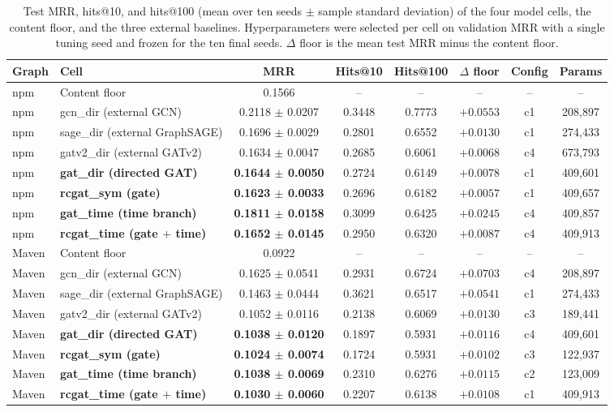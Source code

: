 \begin{table}[t]
\caption{Test MRR, hits@10, and hits@100 (mean over ten seeds $\pm$ sample standard
deviation) of the four model cells, the content floor, and the three external baselines.
Hyperparameters were selected per cell on validation MRR with a single tuning seed and
frozen for the ten final seeds. $\Delta$ floor is the mean test MRR minus the content floor.}
\label{tab:main}
\begin{tabular}{llcccccc}
\toprule
Graph & Cell & MRR & Hits@10 & Hits@100 & $\Delta$ floor & Config & Params \\
\midrule
npm & Content floor & 0.1566 & -- & -- & -- & -- & -- \\
npm & gcn\_dir (external GCN) & 0.2118 $\pm$ 0.0207 & 0.3448 & 0.7773 & $+0.0553$ & c1 & 208{,}897 \\
npm & sage\_dir (external GraphSAGE) & 0.1696 $\pm$ 0.0029 & 0.2801 & 0.6552 & $+0.0130$ & c1 & 274{,}433 \\
npm & gatv2\_dir (external GATv2) & 0.1634 $\pm$ 0.0047 & 0.2685 & 0.6061 & $+0.0068$ & c4 & 673{,}793 \\
npm & \textbf{gat\_dir (directed GAT)} & \textbf{0.1644 $\pm$ 0.0050} & 0.2724 & 0.6149 & $+0.0078$ & c1 & 409{,}601 \\
npm & \textbf{rcgat\_sym (gate)} & \textbf{0.1623 $\pm$ 0.0033} & 0.2696 & 0.6182 & $+0.0057$ & c1 & 409{,}657 \\
npm & \textbf{gat\_time (time branch)} & \textbf{0.1811 $\pm$ 0.0158} & 0.3099 & 0.6425 & $+0.0245$ & c4 & 409{,}857 \\
npm & \textbf{rcgat\_time (gate $+$ time)} & \textbf{0.1652 $\pm$ 0.0145} & 0.2950 & 0.6320 & $+0.0087$ & c4 & 409{,}913 \\
\midrule
Maven & Content floor & 0.0922 & -- & -- & -- & -- & -- \\
Maven & gcn\_dir (external GCN) & 0.1625 $\pm$ 0.0541 & 0.2931 & 0.6724 & $+0.0703$ & c4 & 208{,}897 \\
Maven & sage\_dir (external GraphSAGE) & 0.1463 $\pm$ 0.0444 & 0.3621 & 0.6517 & $+0.0541$ & c1 & 274{,}433 \\
Maven & gatv2\_dir (external GATv2) & 0.1052 $\pm$ 0.0116 & 0.2138 & 0.6069 & $+0.0130$ & c3 & 189{,}441 \\
Maven & \textbf{gat\_dir (directed GAT)} & \textbf{0.1038 $\pm$ 0.0120} & 0.1897 & 0.5931 & $+0.0116$ & c4 & 409{,}601 \\
Maven & \textbf{rcgat\_sym (gate)} & \textbf{0.1024 $\pm$ 0.0074} & 0.1724 & 0.5931 & $+0.0102$ & c3 & 122{,}937 \\
Maven & \textbf{gat\_time (time branch)} & \textbf{0.1038 $\pm$ 0.0069} & 0.2310 & 0.6276 & $+0.0115$ & c2 & 123{,}009 \\
Maven & \textbf{rcgat\_time (gate $+$ time)} & \textbf{0.1030 $\pm$ 0.0060} & 0.2207 & 0.6138 & $+0.0108$ & c1 & 409{,}913 \\
\bottomrule
\end{tabular}
\end{table}
